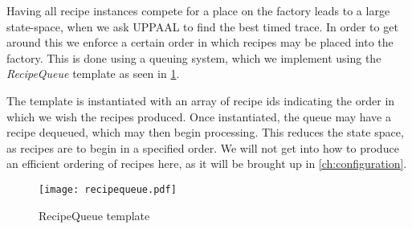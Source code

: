 Having all recipe instances compete for a place on the factory leads to a large state-space, when we ask UPPAAL to find the best timed trace. In order to get around this we enforce a certain order in which recipes may be placed into the factory.  This is done using a queuing system, which we implement using the \emph{RecipeQueue} template as seen in \cref{fig:recipequeue}.

The template is instantiated with an array of recipe ids indicating the order in which we wish the recipes produced. Once instantiated, the queue may have a recipe dequeued, which may then begin processing. This reduces the state space, as recipes are to begin in a specified order. We will not get into how to produce an efficient ordering of recipes here, as it will be brought up in \cref{ch:configuration}.

\begin{figure}[h]
\centering
\texttt{[image: recipequeue.pdf]}
\caption{RecipeQueue template}
\label{fig:recipequeue}
\end{figure}